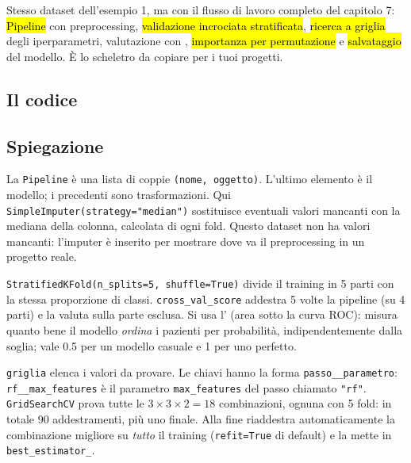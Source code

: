 
\begin{inbreve}
Stesso dataset dell'esempio 1, ma con il flusso di lavoro completo del capitolo 7: \hl{Pipeline} con preprocessing, \hl{validazione incrociata stratificata}, \hl{ricerca a griglia} degli iperparametri, valutazione con , \hl{importanza per permutazione} e \hl{salvataggio} del modello. È lo scheletro da copiare per i tuoi progetti.
\end{inbreve}

\subsection{Il codice}


\subsection{Spiegazione}

\begin{tecnica}
La \texttt{Pipeline} è una lista di coppie \texttt{(nome, oggetto)}. L'ultimo elemento è il modello; i precedenti sono trasformazioni. Qui \texttt{SimpleImputer(strategy="median")} sostituisce eventuali valori mancanti con la mediana della colonna, calcolata  di ogni fold. Questo dataset non ha valori mancanti: l'imputer è inserito per mostrare dove va il preprocessing in un progetto reale.
\end{tecnica}

\begin{tecnica}
\texttt{StratifiedKFold(n\_splits=5, shuffle=True)} divide il training in 5 parti con la stessa proporzione di classi. \texttt{cross\_val\_score} addestra 5 volte la pipeline (su 4 parti) e la valuta sulla parte esclusa. Si usa l' (area sotto la curva ROC): misura quanto bene il modello \emph{ordina} i pazienti per probabilità, indipendentemente dalla soglia; vale 0.5 per un modello casuale e 1 per uno perfetto.
\end{tecnica}

\begin{tecnica}
\texttt{griglia} elenca i valori da provare. Le chiavi hanno la forma \texttt{passo\_\_parametro}: \texttt{rf\_\_max\_features} è il parametro \texttt{max\_features} del passo chiamato \texttt{"rf"}. \texttt{GridSearchCV} prova tutte le $3\times3\times2=18$ combinazioni, ognuna con 5 fold: in totale 90 addestramenti, più uno finale. Alla fine riaddestra automaticamente la combinazione migliore su \emph{tutto} il training (\texttt{refit=True} di default) e la mette in \texttt{best\_estimator\_}.
\end{tecnica}


